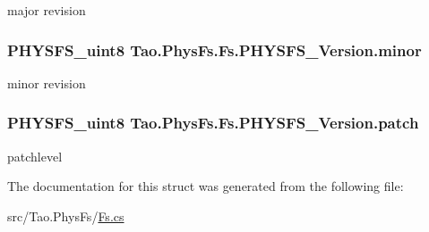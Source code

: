 major revision 

\hypertarget{struct_tao_1_1_phys_fs_1_1_fs_1_1_p_h_y_s_f_s___version_a1927d1c2cd4b1e3d8009ccd0adf51568}{
\subsubsection[{minor}]{\setlength{\rightskip}{0pt plus 5cm}PHYSFS\_\-uint8 {\bf Tao.PhysFs.Fs.PHYSFS\_\-Version.minor}}}
\label{struct_tao_1_1_phys_fs_1_1_fs_1_1_p_h_y_s_f_s___version_a1927d1c2cd4b1e3d8009ccd0adf51568}


minor revision 

\hypertarget{struct_tao_1_1_phys_fs_1_1_fs_1_1_p_h_y_s_f_s___version_a7079dd72e452e14910ecab20c75aafd0}{
\subsubsection[{patch}]{\setlength{\rightskip}{0pt plus 5cm}PHYSFS\_\-uint8 {\bf Tao.PhysFs.Fs.PHYSFS\_\-Version.patch}}}
\label{struct_tao_1_1_phys_fs_1_1_fs_1_1_p_h_y_s_f_s___version_a7079dd72e452e14910ecab20c75aafd0}


patchlevel 



The documentation for this struct was generated from the following file:\begin{DoxyCompactItemize}
\item 
src/Tao.PhysFs/\hyperlink{_fs_8cs}{Fs.cs}\end{DoxyCompactItemize}
